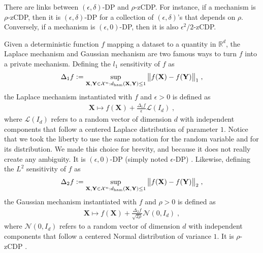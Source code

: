 \documentclass[10pt]{article} %
\newcommand{\R}[0]{\mathbb{R}}
\newcommand{\eqdef}{\vcentcolon=}
\newcommand\set[1]{\mathcal{#1}}
\newcommand\vect[1]{\mathbf{#1}}
\newcommand\ham[2]{d_\mathrm{ham}\left( {#1}, {#2} \right)}
\newcommand\AG[1]{\textcolor{magenta}{#1}}
\begin{document}
There are links between $(\epsilon, \delta)$-DP and $\rho$-zCDP. For instance, if a mechanism is $\rho$-zCDP, then  \citep[Proposition 3]{bun2016concentrated} it is $(\epsilon, \delta)$-DP for a collection of $(\epsilon, \delta)$'s that depends on $\rho$. Conversely,  if a mechanism is $(\epsilon, 0)$-DP, then \citep[Proposition 4]{bun2016concentrated} it is also $\epsilon^2/2$-zCDP.


Given a deterministic function $f$ mapping a dataset to a quantity in $\R^d$, the Laplace mechanism \citep{dwork2006calibrating} and Gaussian mechanism \citep{bun2016concentrated} are two famous ways to turn $f$ into a private mechanism.
Defining the $l_1$ sensitivity of $f$ as
\begin{equation*}
\begin{aligned}
    \Delta_1 f \eqdef \sup_{\vect{X}, \vect{Y} \in \set{X}^n : \ham{\vect{X}}{\vect{Y}} \leq 1} \big\| f (\vect{X})  - f (\vect{Y})\big\|_1 \;,
\end{aligned}
\end{equation*}
the Laplace mechanism instantiated with $f$ and $\epsilon > 0$ is defined as
\begin{equation*}
    \begin{aligned}
        \vect{X} \mapsto f(\vect{X}) + \frac{\Delta_1 f}{\epsilon} \mathcal{L}(I_d) \;,
    \end{aligned}
\end{equation*}
where $\mathcal{L}(I_d)$ refers to a random vector of dimension $d$ with independent components that follow a centered Laplace distribution of parameter $1$. 
Notice that we took the liberty to use the same notation for the random variable and for its distribution. We made this choice for brevity, and because it does not really create any ambiguity.
It is $(\epsilon, 0)$-DP (simply noted $\epsilon$-DP) \citep{dwork2006our,dwork2006calibrating}.
Likewise, defining the $L^2$ sensitivity of $f$ as
\begin{equation*}
\begin{aligned}
    \Delta_2 f \eqdef \sup_{\vect{X}, \vect{Y} \in \set{X}^n : \ham{\vect{X}}{\vect{Y}} \leq 1} \big\| f (\vect{X})  - f (\vect{Y})\big\|_2 \;,
\end{aligned}
\end{equation*}
the Gaussian mechanism instantiated with $f$ and $\rho > 0$ is defined as
\begin{equation*}
    \begin{aligned}
        \vect{X} \mapsto f(\vect{X}) + \frac{\Delta_2 f}{\sqrt{2 \rho}} \mathcal{N}(0, I_d) \;,
    \end{aligned}
\end{equation*}
where $\mathcal{N}(0, I_d)$ refers to a random vector of dimension $d$ with independent components that follow a centered Normal distribution of variance $1$. It is $\rho$-zCDP \citep{bun2016concentrated}.
\end{document}
